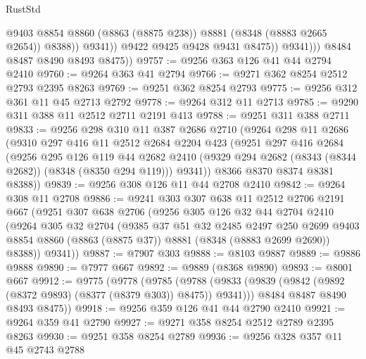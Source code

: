 \begin{lexlean}{RustStd}
\begin{coremodule}
{\begin{coremodule}
{{{{{{{{{{{{{{{{{{{{{{{{{{{{{{{{{{{{{{{{{{{{{{{{{{                          @9403
                          @8854
                          @8860
                          (@8863 (@8875 @238))
                          @8881
                          (@8348 (@8883 @2665 @2654))
                          @8388))
                      @9341))
                  @9422
                  @9425
                  @9428
                  @9431
                  @8475))
              @9341)))
        @8484
        @8487
        @8490
        @8493
        @8475))
@9757 := @9256 @363 @126 @41 @44 @2794 @2410
@9760 := @9264 @363 @41 @2794
@9766 := @9271 @362 @8254 @2512 @2793 @2395 @8263
@9769 := @9251 @362 @8254 @2793
@9775 := @9256 @312 @361 @11 @45 @2713 @2792
@9778 := @9264 @312 @11 @2713
@9785 := @9290 @311 @388 @11 @2512 @2711 @2191 @413
@9788 := @9251 @311 @388 @2711
@9833 := @9256
    @298
    @310
    @11
    @387
    @2686
    @2710
    (@9264
      @298
      @11
      @2686
      (@9310
        @297
        @416
        @11
        @2512
        @2684
        @2204
        @423
        (@9251
          @297
          @416
          @2684
          (@9256
            @295
            @126
            @119
            @44
            @2682
            @2410
            (@9329 @294 @2682 (@8343 (@8344 @2682)) (@8348 (@8350 @294 @119)))
            @9341))
        @8366
        @8370
        @8374
        @8381
        @8388))
@9839 := @9256 @308 @126 @11 @44 @2708 @2410
@9842 := @9264 @308 @11 @2708
@9886 := @9241
    @303
    @307
    @638
    @11
    @2512
    @2706
    @2191
    @667
    (@9251
      @307
      @638
      @2706
      (@9256
        @305
        @126
        @32
        @44
        @2704
        @2410
        (@9264
          @305
          @32
          @2704
          (@9385
            @37
            @51
            @32
            @2485
            @2497
            @250
            @2699
            @9403
            @8854
            @8860
            (@8863 (@8875 @37))
            @8881
            (@8348 (@8883 @2699 @2690))
            @8388))
        @9341))
@9887 := @7907 @303
@9888 := @8103 @9887
@9889 := @9886 @9888
@9890 := @7977 @667
@9892 := @9889 (@8368 @9890)
@9893 := @8001 @667
@9912 := @9775
    (@9778
      (@9785
        (@9788 (@9833 (@9839 (@9842 (@9892 (@8372 @9893) (@8377 (@8379 @303)) @8475)) @9341)))
        @8484
        @8487
        @8490
        @8493
        @8475))
@9918 := @9256 @359 @126 @41 @44 @2790 @2410
@9921 := @9264 @359 @41 @2790
@9927 := @9271 @358 @8254 @2512 @2789 @2395 @8263
@9930 := @9251 @358 @8254 @2789
@9936 := @9256 @328 @357 @11 @45 @2743 @2788
}}}}}}}}}}}}}}}}}}}}}}}}}}}}}}}}}}}}}}}}}}}}}}}}}}
\end{coremodule}}
\end{coremodule}
\end{lexlean}
